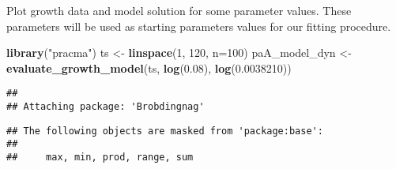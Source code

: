 \documentclass[]{article}
\newenvironment{Shaded}{\begin{snugshade}}{\end{snugshade}}
\newcommand{\KeywordTok}[1]{\textcolor[rgb]{0.13,0.29,0.53}{\textbf{#1}}}
\newcommand{\DataTypeTok}[1]{\textcolor[rgb]{0.13,0.29,0.53}{#1}}
\newcommand{\DecValTok}[1]{\textcolor[rgb]{0.00,0.00,0.81}{#1}}
\newcommand{\FloatTok}[1]{\textcolor[rgb]{0.00,0.00,0.81}{#1}}
\newcommand{\StringTok}[1]{\textcolor[rgb]{0.31,0.60,0.02}{#1}}
\newcommand{\NormalTok}[1]{#1}
\begin{document}
Plot growth data and model solution for some parameter values. These
parameters will be used as starting parameters values for our fitting
procedure.

\begin{Shaded}
\begin{Highlighting}[]
\KeywordTok{library}\NormalTok{(}\StringTok{"pracma"}\NormalTok{)}
\NormalTok{ts <-}\StringTok{ }\KeywordTok{linspace}\NormalTok{(}\DecValTok{1}\NormalTok{, }\DecValTok{120}\NormalTok{, }\DataTypeTok{n=}\DecValTok{100}\NormalTok{)}
\NormalTok{paA_model_dyn <-}\StringTok{ }\KeywordTok{evaluate_growth_model}\NormalTok{(ts, }\KeywordTok{log}\NormalTok{(}\FloatTok{0.08}\NormalTok{), }\KeywordTok{log}\NormalTok{(}\FloatTok{0.0038210}\NormalTok{))}
\end{Highlighting}
\end{Shaded}

\begin{verbatim}
## 
## Attaching package: 'Brobdingnag'
\end{verbatim}

\begin{verbatim}
## The following objects are masked from 'package:base':
## 
##     max, min, prod, range, sum
\end{verbatim}
\end{document}
